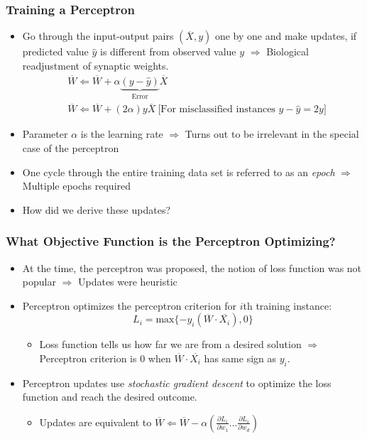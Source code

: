 \begin{frame}
\frametitle{Training a Perceptron}
\begin{itemize}
\item Go through the input-output pairs $(\overline{X}, y)$ one by one and make
updates, if predicted value $\hat{y}$ is different from observed
value $y$ $\Rightarrow$ Biological readjustment of synaptic weights.
\begin{eqnarray*}
& \overline{W}  \Leftarrow  \overline{W} +
\alpha \underbrace{(y - \hat{y})}_{\mbox{Error}} \overline{X}\\
& \overline{W}  \Leftarrow  \overline{W} + (2 \alpha)  y
\overline{X} \ \mbox{[For misclassified instances $y -\hat{y}= 2y$]}
\end{eqnarray*}
\item Parameter $\alpha$ is the learning rate $\Rightarrow$ Turns
out to be irrelevant in the special case of the perceptron
\item One cycle through the entire training data set is referred to
as an {\em epoch} $\Rightarrow$ Multiple epochs required
\item How did we derive these updates?
\end{itemize}
\end{frame}




\begin{frame}
\frametitle{What Objective Function is the Perceptron Optimizing?}
\begin{itemize}
\item At the time, the perceptron was proposed, the notion of loss
function was not popular $\Rightarrow$ Updates were heuristic

\item  Perceptron optimizes the perceptron criterion for $i$th training instance:
\begin{equation*}
 L_i= \mbox{max} \{ -y_i (\overline{W}\cdot \overline{X_i}), 0 \}
\end{equation*}
\begin{itemize}
\item Loss function tells us how far we are from a desired solution
$\Rightarrow$ Perceptron criterion is  0 when $\overline{W} \cdot
\overline{X_i}$ has same sign as $y_i$.
\end{itemize}
\item  Perceptron updates use  {\em stochastic gradient descent} to optimize the loss function and reach
the desired outcome.
\begin{itemize}
\item Updates are equivalent to $\overline{W} \Leftarrow  \overline{W}
- \alpha \left( \frac{\partial L_i}{\partial w_1} \ldots
\frac{\partial L_i}{\partial w_d} \right)$ \end{itemize}
\end{itemize}
\end{frame}


